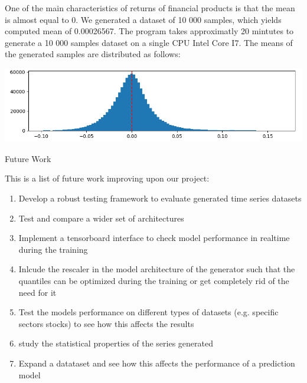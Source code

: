 \documentclass{article}
\begin{document}
    One of the main characteristics of returns of financial products is that the mean is almost equal to 0.
    We generated a dataset of 10 000 samples, which yields computed mean of 0.00026567.
    The program takes approximatly 20 mintutes to generate a 10 000 samples dataset on a single CPU Intel Core I7. The means of the generated samples are distributed as follows:
    \begin{center}
        \includegraphics[scale=0.75]{imgs/riccardo/generated.png}
    \end{center}
    
    \newpage
    \begin{center}
        {\huge{Future Work}}
    \end{center} 
    This is a list of future work improving upon our project:
    \begin{enumerate}
        \item Develop a robust testing framework to evaluate generated time series datasets
        \item Test and compare a wider set of architectures
        \item Implement a tensorboard interface to check model performance in realtime during the training
        \item Inlcude the rescaler in the model architecture of the generator such that the quantiles can be optimized during the training or get completely rid of the need for it
        \item Test the models performance on different types of datasets (e.g. specific sectors stocks) to see how this affects the results
        \item study the statistical properties of the series generated
        \item Expand a datataset and see how this affects the performance of a prediction model
    \end{enumerate}

    
    \begin{thebibliography}{9}
        
        \bibitem{}
        \end{thebibliography}
\end{document}
